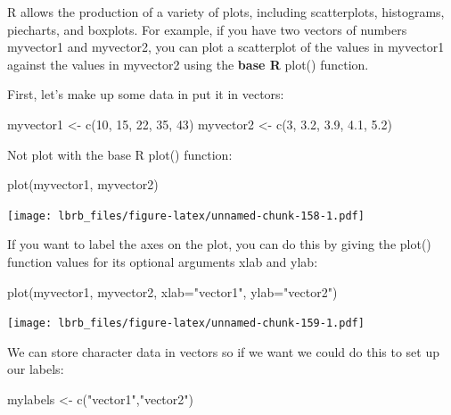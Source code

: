 \documentclass[
]{book}
\newenvironment{Shaded}{\begin{snugshade}}{\end{snugshade}}
\newcommand{\AttributeTok}[1]{\textcolor[rgb]{0.77,0.63,0.00}{#1}}
\newcommand{\DecValTok}[1]{\textcolor[rgb]{0.00,0.00,0.81}{#1}}
\newcommand{\FloatTok}[1]{\textcolor[rgb]{0.00,0.00,0.81}{#1}}
\newcommand{\FunctionTok}[1]{\textcolor[rgb]{0.00,0.00,0.00}{#1}}
\newcommand{\NormalTok}[1]{#1}
\newcommand{\OtherTok}[1]{\textcolor[rgb]{0.56,0.35,0.01}{#1}}
\newcommand{\StringTok}[1]{\textcolor[rgb]{0.31,0.60,0.02}{#1}}
\begin{document}
R allows the production of a variety of plots, including scatterplots, histograms, piecharts, and boxplots. For example, if you have two vectors of numbers myvector1 and myvector2, you can plot a scatterplot of the values in myvector1 against the values in myvector2 using the \textbf{base R} plot() function.

First, let's make up some data in put it in vectors:

\begin{Shaded}
\begin{Highlighting}[]
\NormalTok{myvector1 }\OtherTok{\textless{}{-}} \FunctionTok{c}\NormalTok{(}\DecValTok{10}\NormalTok{, }\DecValTok{15}\NormalTok{, }\DecValTok{22}\NormalTok{, }\DecValTok{35}\NormalTok{, }\DecValTok{43}\NormalTok{)}
\NormalTok{myvector2 }\OtherTok{\textless{}{-}} \FunctionTok{c}\NormalTok{(}\DecValTok{3}\NormalTok{, }\FloatTok{3.2}\NormalTok{, }\FloatTok{3.9}\NormalTok{, }\FloatTok{4.1}\NormalTok{, }\FloatTok{5.2}\NormalTok{)}
\end{Highlighting}
\end{Shaded}

Not plot with the base R plot() function:

\begin{Shaded}
\begin{Highlighting}[]
\FunctionTok{plot}\NormalTok{(myvector1, myvector2)}
\end{Highlighting}
\end{Shaded}

\texttt{[image: lbrb\_files/figure-latex/unnamed-chunk-158-1.pdf]}

If you want to label the axes on the plot, you can do this by giving the plot() function values for its optional arguments xlab and ylab:

\begin{Shaded}
\begin{Highlighting}[]
\FunctionTok{plot}\NormalTok{(myvector1, }
\NormalTok{     myvector2, }
     \AttributeTok{xlab=}\StringTok{"vector1"}\NormalTok{, }
     \AttributeTok{ylab=}\StringTok{"vector2"}\NormalTok{)}
\end{Highlighting}
\end{Shaded}

\texttt{[image: lbrb\_files/figure-latex/unnamed-chunk-159-1.pdf]}

We can store character data in vectors so if we want we could do this to set up our labels:

\begin{Shaded}
\begin{Highlighting}[]
\NormalTok{mylabels }\OtherTok{\textless{}{-}}  \FunctionTok{c}\NormalTok{(}\StringTok{"vector1"}\NormalTok{,}\StringTok{"vector2"}\NormalTok{)}
\end{Highlighting}
\end{Shaded}
\end{document}
